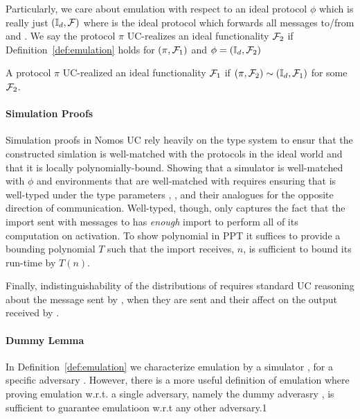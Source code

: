 Particularly, we care about emulation with respect to an ideal protocol $\phi$ which is really just $(\mathbb{I}_d, \mathcal{F})$ where \idealP is the ideal protocol which forwards all messages to/from \Environment and \F.
We say the protocol $\pi$ UC-realizes an ideal functionality $\mathcal{F}_2$ if Definition~\ref{def:emulation} holds for $(\pi, \mathcal{F}_1)$ and  $\phi = (\mathbb{I}_d, \mathcal{F}_2)$

\begin{definition}[UC-Realize]
A protocol $\pi$ UC-realized an ideal functionality $\mathcal{F}_1$ if $(\pi, \mathcal{F}_2) \sim (\mathbb{I}_d, \mathcal{F}_1)$ for some $\mathcal{F}_2$.
\end{definition}

\paragraph{Simulation Proofs}
Simulation proofs in Nomos UC rely heavily on the type system to ensur that the constructed simlation is well-matched with the protocols in the ideal world and that it is locally polynomially-bound.
Showing that a simulator is well-matched with $\phi$ and environments \Environment that are well-matched with \Adversary requires ensuring that \Simulator is well-typed under the type parameters , ,  and their analogues for the opposite direction of communication. 
Well-typed, though, only captures the fact that the import sent with messages to \Simulator has \textit{enough} import to perform all of its computation on activation. 
To show  polynomial in PPT it suffices to provide a bounding polynomial $T$ such that the import \Simulator receives, $n$, is sufficient to bound its run-time by $T(n)$. 

Finally, indistinguishability of the distributions of  requires standard UC reasoning about the message sent by \Simulator, when they are sent and their affect on the output received by \Environment.

\paragraph{Dummy Lemma}

In Definition~\ref{def:emulation} we characterize emulation by a simulator \Simulator, for a specific adversary \Adversary.
However, there is a more useful definition of emulation where proving emulation w.r.t. a single adversary, namely the dummy adverasry \DummyAdv, is sufficient to guarantee emulatioon w.r.t any other adversary.1

